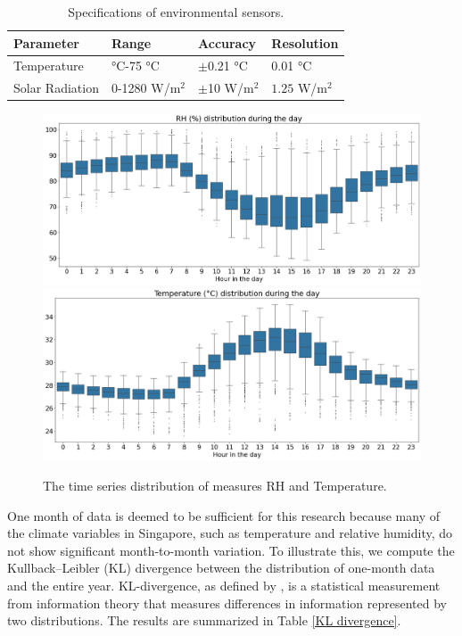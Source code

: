 \documentclass[a4paper,fleqn]{cas-sc}
\begin{document}
\begin{table}[width=.8\linewidth,cols=3,pos=h]
\caption{Specifications of environmental sensors.}\label{sensor}
\begin{tabular*}{\tblwidth}{@{} LLLL@{} }
\toprule
Parameter  & Range & Accuracy &Resolution\\
\midrule
Temperature&   °C-75 °C & $\pm $0.21 °C&0.01 °C\\
Solar Radiation& 0-1280 W/m$^2$ &$\pm$10 W/m$^2$& $1.25$ W/m$^2$\\
\bottomrule
\end{tabular*}
\end{table}


\begin{figure}
	\centering
	\includegraphics[width=.95\textwidth]{figs/new_figs/rhboxplot.png}
 \includegraphics[width=.95\textwidth]{figs/new_figs/temboxplot.png}
	\caption{The time series distribution of measures RH and Temperature.}
	\label{FIG:databoxplot}
\end{figure}


One month of data is deemed to be sufficient for this research because many of the climate variables in Singapore, such as temperature and relative humidity, do not show significant month-to-month variation. To illustrate this, we compute the Kullback–Leibler (KL) divergence between the distribution of one-month data and the entire year. KL-divergence, as defined by \cite{kullback1951information}, is a statistical measurement from information theory that measures differences in information represented by two distributions. The results are summarized in Table \ref{KL divergence}.
\end{document}
